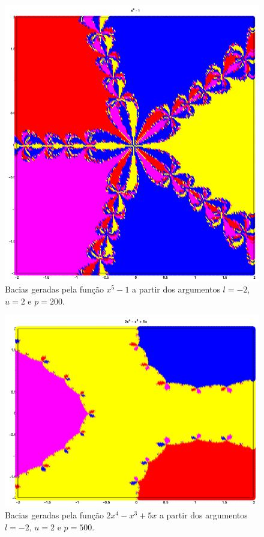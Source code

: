 \documentclass[11pt,reqno,a4paper]{amsart}
\begin{document}
\begin{figure}[p]
    \centering
    \includegraphics[width=15cm]{function_3.png}
    \caption{Bacias geradas pela função $x^5 - 1$ a partir dos argumentos $l = -2$, $u = 2$ e $p = 200$.}
    \label{fig:function_3}
\end{figure}

\begin{figure}[p]
    \centering
    \includegraphics[width=15cm]{function_4.png}
    \caption{Bacias geradas pela função $2x^4 - x^3 + 5x$ a partir dos argumentos $l = -2$, $u = 2$ e $p = 500$.}
    \label{fig:function_4}
\end{figure}
\end{document}
